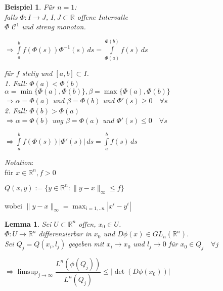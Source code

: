 \documentclass[11pt]{memoir}
\theoremstyle{changebreak}
\newtheorem{Beispiel}{Beispiel}[chapter]
\newtheorem{Lemma}{Lemma}[chapter]
\begin{document}
\begin{Beispiel}
Für $n = 1$: \\
falls $\Phi: I \rightarrow J$, $I, J \subset \mathbb R$ offene Intervalle \\
$\Phi$ $\mathscr C^1$ und streng monoton. \\
\begin{center}
	$\Rightarrow \int\limits_a^b f\left(\Phi(s)\right) \Phi^{-1}(s) \, ds = \int\limits_{\Phi(a)}^{\Phi(b)} f(s) \, ds$
\end{center}
für $f$ stetig und $[a, b] \subset I$. \\

\emph{1. Fall}: $\Phi(a) < \Phi(b)$ \\
$\alpha = \min{\{\Phi(a), \Phi(b)\}}, \beta = \max{\{\Phi(a), \Phi(b)\}} $ \\
$\Rightarrow \alpha = \Phi(a)$ und $\beta = \Phi(b)$ und $\Phi'(s) \geq 0\quad \forall s$ \\

\emph{2. Fall}: $\Phi(b) > \Phi(a)$ \\
$\Rightarrow \alpha= \Phi(b)$ ung $\beta = \Phi(a)$ und $\Phi'(s) \leq 0\quad \forall s$
\begin{center}
	$\Rightarrow \int\limits_a^b f(\Phi(s))|\Phi'(s)|\, ds = \int\limits_a^b f(s)\, ds$
\end{center}
\end{Beispiel}

\emph{Notation}: \\
für $x \in \mathbb R^n, f > 0$ \\
\begin{center}
	$Q(x, y) := \{y \in \mathbb R^n: \|y-x\|_\infty \leq f\}$
\end{center}
wobei $\|y-x\|_\infty = \max_{i = 1, .. n} |x^{i} - y^{i}|$


\begin{Lemma}
Sei $U \subset \mathbb R^n$ offen, $x_0 \in U$. \\
$\Phi: U \rightarrow \mathbb R^n$ differenzierbar in $x_0$ und $D\phi(x) \in GL_n(\mathbb R^n)$. \\
Sei $Q_j = Q(x_i, l_j)$ gegeben mit $x_i \rightarrow x_0$ und $l_j \rightarrow 0$ für $x_0 \in Q_j\quad \forall j$
\begin{center}
	$\Rightarrow  \limsup_{j \rightarrow \infty} \dfrac{L^n(\phi(Q_j))}{L^n(Q_j)} \leq \left| \det (D\phi(x_0))\right|$
\end{center}
\end{Lemma}
\end{document}
